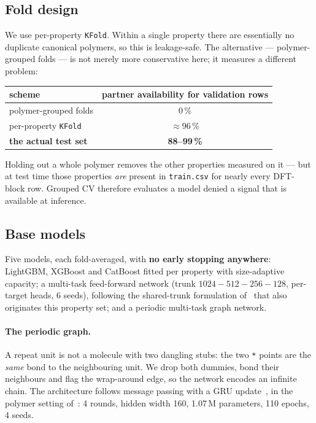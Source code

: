 \documentclass[11pt,a4paper]{article}
\begin{document}
\subsection{Fold design}
\label{sec:folds}

We use per-property \texttt{KFold}. Within a single property there are
essentially no duplicate canonical polymers, so this is leakage-safe. The
alternative --- polymer-grouped folds --- is not merely more conservative here;
it measures a different problem:

\begin{center}
\small
\begin{tabular}{lc}
\toprule
scheme & partner availability for validation rows \\
\midrule
polymer-grouped folds & 0\,\% \\
per-property \texttt{KFold} & $\approx$96\,\% \\
\textbf{the actual test set} & \textbf{88--99\,\%} \\
\bottomrule
\end{tabular}
\end{center}

Holding out a whole polymer removes the other properties measured on it --- but
at test time those properties \emph{are} present in \texttt{train.csv} for
nearly every DFT-block row. Grouped CV therefore evaluates a model denied a
signal that is available at inference.

\subsection{Base models}

Five models, each fold-averaged, with \textbf{no early stopping anywhere}:
LightGBM, XGBoost and CatBoost fitted per property with size-adaptive capacity;
a multi-task feed-forward network (trunk $1024\!-\!512\!-\!256\!-\!128$, per-target
heads, 6 seeds), following the shared-trunk formulation of~\cite{kuenneth2021} that
also originates this property set; and a periodic multi-task graph network.

\paragraph{The periodic graph.} A repeat unit is not a molecule with two
dangling stubs: the two \texttt{*} points are the \emph{same} bond to the
neighbouring unit. We drop both dummies, bond their neighbours and flag the
wrap-around edge, so the network encodes an infinite chain. The architecture
follows message passing with a GRU update~\cite{gilmer}, in the polymer setting
of~\cite{polygnn}: 4 rounds, hidden width 160, 1.07\,M parameters, 110 epochs,
4 seeds.
\end{document}
